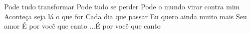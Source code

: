 \beginverse 
Pode tudo transformar
Pode tudo se perder
Pode o mundo virar contra mim
Aconteça seja lá o que for
Cada dia que passar
Eu quero ainda muito mais
Seu amor
É por você que canto
\endverse
{}
\beginverse 
...É por você que canto
\endverse
\vspace{4em} %
\begin{comment}
\lstset{basicstyle=\scriptsize\bf} %
\tab{Solo 1}
\begin{lstlisting}
E|-----------------------------------------------------|
B|-----------------------------------------------------|
G|-----------------------------------------------------|
D|-----------------------------------------------------|
A|-----------------------------------------------------|
E|-----------------------------------------------------|
\end{lstlisting}
\end{comment}
\begin{comment}

\color{drawChord}\gtab{\color{nameChord} X}{}%
\color{drawChord}\gtab{\color{nameChord} X}{}%
\color{drawChord}\gtab{\color{nameChord} X}{}%
\color{drawChord}\gtab{\color{nameChord} X}{}%

\end{comment}
\endsong

